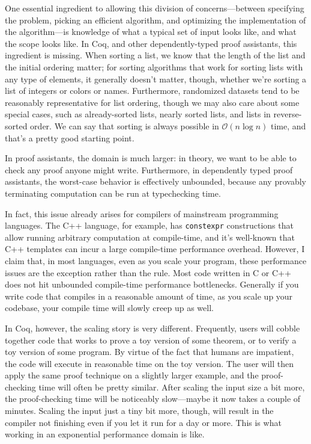 One essential ingredient to allowing this division of concerns---between specifying the problem, picking an efficient algorithm, and optimizing the implementation of the algorithm---is knowledge of what a typical set of input looks like, and what the scope looks like.
In Coq, and other dependently-typed proof assistants, this ingredient is missing.
When sorting a list, we know that the length of the list and the initial ordering matter; for sorting algorithms that work for sorting lists with any type of elements, it generally doesn't matter, though, whether we're sorting a list of integers or colors or names.
Furthermore, randomized datasets tend to be reasonably representative for list ordering, though we may also care about some special cases, such as already-sorted lists, nearly sorted lists, and lists in reverse-sorted order.
We can say that sorting is always possible in $\mathcal O(n\log n)$ time, and that's a pretty good starting point.

In proof assistants, the domain is much larger: in theory, we want to be able to check any proof anyone might write.
Furthermore, in dependently typed proof assistants, the worst-case behavior is effectively unbounded, because any provably terminating computation can be run at typechecking time.

In fact, this issue already arises for compilers of mainstream programming languages.
The C++ language, for example, has \texttt{constexpr} constructions that allow running arbitrary computation at compile-time, and it's well-known that C++ templates can incur a large compile-time performance overhead.
However, I claim that, in most languages, even as you scale your program, these performance issues are the exception rather than the rule.
Most code written in C or C++ does not hit unbounded compile-time performance bottlenecks.
Generally if you write code that compiles in a reasonable amount of time, as you scale up your codebase, your compile time will slowly creep up as well.

In Coq, however, the scaling story is very different.
Frequently, users will cobble together code that works to prove a toy version of some theorem, or to verify a toy version of some program.
By virtue of the fact that humans are impatient, the code will execute in reasonable time on the toy version.
The user will then apply the same proof technique on a slightly larger example, and the proof-checking time will often be pretty similar.
After scaling the input size a bit more, the proof-checking time will be noticeably slow---maybe it now takes a couple of minutes.
Scaling the input just a tiny bit more, though, will result in the compiler not finishing even if you let it run for a day or more.
This is what working in an exponential performance domain is like.

